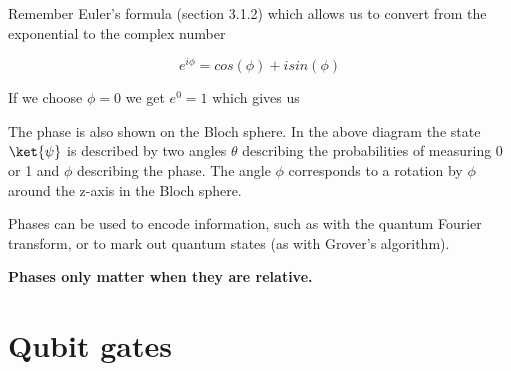 \documentclass{book}
\begin{document}
Remember Euler's formula (section 3.1.2) which allows us to convert from the exponential to the complex number

$$ e^{i \phi} = cos(\phi) + i sin(\phi) $$

If we choose $\phi = 0$ we get $e^0 = 1$ which gives us 

The phase is also shown on the Bloch sphere. In the above diagram the state $\ket{\psi}$ is described by two angles $\theta$ describing the probabilities of measuring 0 or 1 and $\phi$ describing the phase. The angle $\phi$ corresponds to a rotation by $\phi$ around the z-axis in the Bloch sphere.  

Phases can be used to encode information, such as with the quantum Fourier transform, or to mark out quantum states (as with Grover's algorithm). 

\textbf{Phases only matter when they are relative.}



 \section{Qubit gates }
\end{document}
